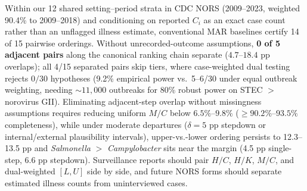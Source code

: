 Within our 12 shared setting--period strata in CDC NORS (2009--2023, weighted 90.4\% to 2009--2018) and conditioning on reported $C_i$ as an exact case count rather than an unflagged illness estimate, conventional MAR baselines certify 14 of 15 pairwise orderings. Without unrecorded-outcome assumptions, \textbf{0 of 5 adjacent pairs} along the canonical ranking chain separate ($4.7$--$18.4\text{ pp}$ overlaps); all 4/15 separated pairs skip tiers, where case-weighted dual testing rejects $0/30$ hypotheses (9.2\% empirical power vs.\ 5--6/30 under equal outbreak weighting, needing $\sim 11,000$ outbreaks for 80\% robust power on STEC $>$ norovirus GII). Eliminating adjacent-step overlap without missingness assumptions requires reducing uniform $M/C$ below $6.5\%$--$9.8\%$ ($\ge 90.2\%$--$93.5\%$ completeness), while under moderate departures ($\delta = 5\text{ pp}$ stepdown or internal/external plausibility intervals), upper-vs.-lower ordering persists to 12.3--13.5 pp and \textit{Salmonella} $>$ \textit{Campylobacter} sits near the margin (4.5 pp single-step, 6.6 pp stepdown). Surveillance reports should pair $H/C$, $H/K$, $M/C$, and dual-weighted $[L, U]$ side by side, and future NORS forms should separate estimated illness counts from uninterviewed cases.
